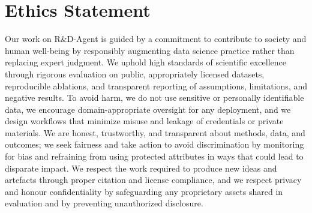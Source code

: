 \section*{Ethics Statement}
Our work on R\&D-Agent is guided by a commitment to contribute to society and human well-being by responsibly augmenting data science practice rather than replacing expert judgment. We uphold high standards of scientific excellence through rigorous evaluation on public, appropriately licensed datasets, reproducible ablations, and transparent reporting of assumptions, limitations, and negative results. To avoid harm, we do not use sensitive or personally identifiable data, we encourage domain-appropriate oversight for any deployment, and we design workflows that minimize misuse and leakage of credentials or private materials. We are honest, trustworthy, and transparent about methods, data, and outcomes; we seek fairness and take action to avoid discrimination by monitoring for bias and refraining from using protected attributes in ways that could lead to disparate impact. We respect the work required to produce new ideas and artefacts through proper citation and license compliance, and we respect privacy and honour confidentiality by safeguarding any proprietary assets shared in evaluation and by preventing unauthorized disclosure.